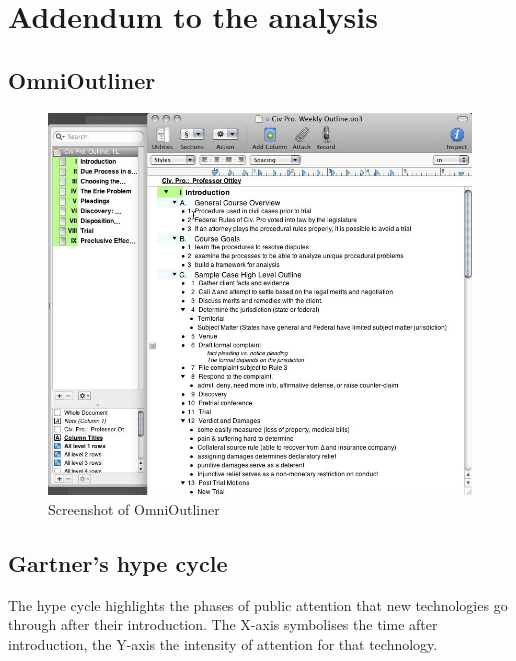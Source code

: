 \section{Addendum to the analysis}

\subsection{OmniOutliner}

\medskip
\begin{figure}[ht] 
  \begin{center}
    \includegraphics[width=\textwidth]{grafik/omnioutliner-screenshot} 
  \end{center}
  \caption{Screenshot of OmniOutliner \cite{omnioutliner:screenshot}}
  \label{fig:omnioutliner-screenshot} 
\end{figure}



\subsection{Gartner's hype cycle}
\label{subsec:hype-cycle}

The hype cycle highlights the phases of public attention that new technologies go through after their introduction. The X-axis symbolises the time after introduction, the Y-axis the intensity of attention for that technology.


